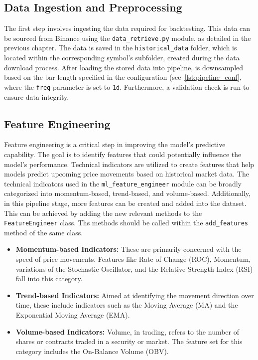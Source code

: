 \subsection{Data Ingestion and Preprocessing}
The first step involves ingesting the data required for backtesting.
This data can be sourced from Binance using the \texttt{data\_retrieve.py} module, as detailed in the previous chapter.
The data is saved in the \texttt{historical\_data} folder, which is located within the corresponding symbol's subfolder, created during the data download process.
After loading the stored data into pipeline, is downsampled based on the bar length specified in the configuration (see~\ref{lst:pipeline_conf}, where the \texttt{freq} parameter is set to \texttt{1d}.
Furthermore, a validation check is run to ensure data integrity.

\FloatBarrier %
\subsection{Feature Engineering}
Feature engineering is a critical step in improving the model's predictive capability.
The goal is to identify features that could potentially influence the model's performance.
Technical indicators are utilized to create features that help models predict upcoming price movements based on historical market data.
The technical indicators used in the \texttt{ml\_feature\_engineer} module can be broadly categorized into momentum-based, trend-based, and volume-based.
Additionally, in this pipeline stage, more features can be created and added into the dataset.
This can be achieved by adding the new relevant methods to the \texttt{FeatureEngineer} class.
Ths methods should be called within the \texttt{add\_features} method of the same class.

\begin{itemize}
    \item \textbf{Momentum-based Indicators:} These are primarily concerned with the speed of price movements. Features like Rate of Change (ROC), Momentum, variations of the Stochastic Oscillator, and the Relative Strength Index (RSI) fall into this category.

    \item \textbf{Trend-based Indicators:} Aimed at identifying the movement direction over time, these include indicators such as the Moving Average (MA) and the Exponential Moving Average (EMA).

    \item \textbf{Volume-based Indicators:} Volume, in trading, refers to the number of shares or contracts traded in a security or market. The feature set for this category includes the On-Balance Volume (OBV).
\end{itemize}

